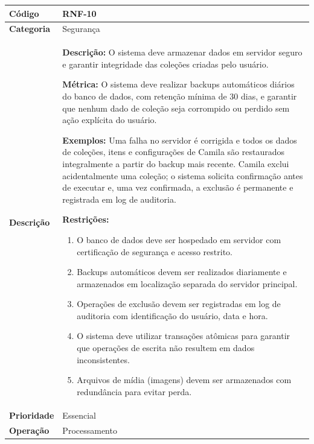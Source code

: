 \FloatBarrier
\begin{quadro}[h!]
\caption{RNF-10 -- Segurança e Integridade dos Dados}
\label{quad:rnf10}
\begin{tabular}{|p{3.2cm}|p{11.8cm}|}
\hline
\textbf{Código}     & RNF-10 \\ \hline
\textbf{Categoria}  & Segurança \\ \hline
\textbf{Descrição}  &
\textbf{Descrição:} O sistema deve armazenar dados em servidor seguro e garantir integridade das coleções criadas pelo usuário.

\textbf{Métrica:} O sistema deve realizar backups automáticos diários do banco de dados, com retenção mínima de 30 dias, e garantir que nenhum dado de coleção seja corrompido ou perdido sem ação explícita do usuário.

\textbf{Exemplos:} Uma falha no servidor é corrigida e todos os dados de coleções, itens e configurações de Camila são restaurados integralmente a partir do backup mais recente.
Camila exclui acidentalmente uma coleção; o sistema solicita confirmação antes de executar e, uma vez confirmada, a exclusão é permanente e registrada em log de auditoria.

\textbf{Restrições:}
\begin{enumerate}[nosep,leftmargin=1.2em,topsep=2pt,partopsep=0pt,parsep=0pt,itemsep=1pt]
  \item O banco de dados deve ser hospedado em servidor com certificação de segurança e acesso restrito.
  \item Backups automáticos devem ser realizados diariamente e armazenados em localização separada do servidor principal.
  \item Operações de exclusão devem ser registradas em log de auditoria com identificação do usuário, data e hora.
  \item O sistema deve utilizar transações atômicas para garantir que operações de escrita não resultem em dados inconsistentes.
  \item Arquivos de mídia (imagens) devem ser armazenados com redundância para evitar perda.
\end{enumerate} \\ \hline
\textbf{Prioridade} & Essencial \\ \hline
\textbf{Operação}   & Processamento \\ \hline
\end{tabular}
\end{quadro}
\FloatBarrier

